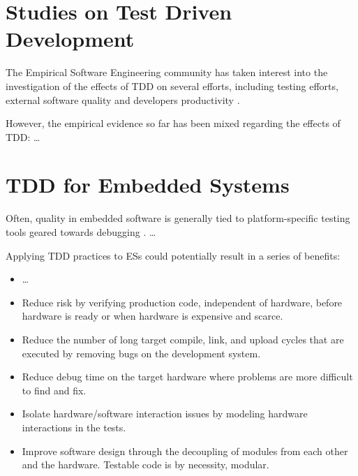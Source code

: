 \section{Studies on Test Driven Development}
The Empirical Software Engineering community has taken interest into the investigation of the effects of TDD on several efforts, including testing efforts, external software quality and developers productivity \cite{DBLP:conf/esem/FucciS0SSUTJO16} \cite{DBLP:journals/tse/ErdogmusMT05} \cite{DBLP:journals/infsof/Madeyski10}.

However, the empirical evidence so far has been mixed regarding the effects of TDD: \dots



\section{TDD for Embedded Systems}
Often, quality in embedded software is generally tied to platform-specific testing tools geared towards debugging \cite{TDDEmbeddedSoftware}.
\dots

Applying TDD practices to ESs could potentially result in a series of benefits:
\begin{itemize}
    \item \dots
\end{itemize}


\begin{itemize}
    \item Reduce risk by verifying production code, independent of hardware, before hardware is ready or when hardware is expensive and scarce.
    \item Reduce the number of long target compile, link, and upload cycles that are executed by removing bugs on the development system.
    \item Reduce debug time on the target hardware where problems are more difficult to find and fix.
    \item Isolate hardware/software interaction issues by modeling hardware interactions in the tests.
    \item Improve software design through the decoupling of modules from each other and the hardware. Testable code is by necessity, modular.
\end{itemize}


